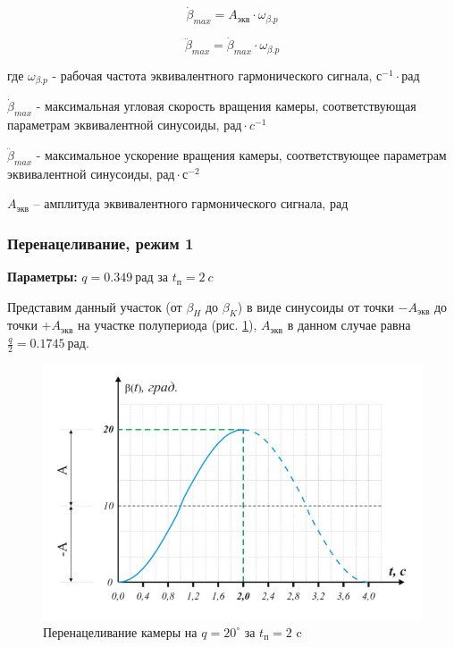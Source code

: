 \begin{equation}
    \label{max_speed_for_equiv_signal}
    \dot{\beta}_{max} = A_\textit{экв} \cdot \omega_{\beta.p}
\end{equation}

\begin{equation}
    \label{max_acceleration_for_equiv_signal}
    \ddot{\beta}_{max} = \dot{\beta}_{max} \cdot \omega_{\beta.p}
\end{equation}

где $\omega_{\beta.p}$ - рабочая частота эквивалентного гармонического сигнала, $\textit{с}^{-1} \cdot
\textit{рад}$

$\dot{\beta}_{max}$ - максимальная угловая скорость вращения камеры,
соответствующая параметрам эквивалентной синусоиды, $\textit{рад} \cdot \textit{c}^{-1}$

$\ddot{\beta}_{max}$ - максимальное ускорение вращения камеры,
соответствующее параметрам эквивалентной синусоиды, $\textit{рад} \cdot \textit{с}^{-2}$

$A_{\textit{экв}}$ – амплитуда эквивалентного гармонического сигнала, $\textit{рад}$

\subsubsection{Перенацеливание, режим 1}

\textbf{Параметры:} $q = 0.349 ~\textit{рад}$ за $t_{\textit{п}} = 2 ~\textit{c}$

Представим данный участок (от $\beta_{H}$ до $\beta_{K}$) в виде синусоиды
от точки $-A_\textit{экв}$ до точки $+A_\textit{экв}$ на участке полупериода
(рис. \ref{retarget_20grad_2sec}), $A_\textit{экв}$ в данном случае
равна $\frac{q}{2} = 0.1745 ~\textit{рад}$.

\begin{figure}[ht!]
    \centering
    \includegraphics[keepaspectratio]{./src/pictures/retarget_equivalent_input_signals/20grad_2sec}
    \caption{Перенацеливание камеры на $q = 20^{\circ}$ за $t_\textit{п} = 2$ c}
    \label{retarget_20grad_2sec}
\end{figure}

